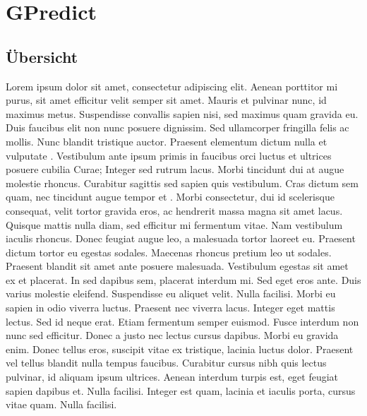 
\chapter{GPredict}

\section{Übersicht}

Lorem ipsum dolor sit amet, consectetur adipiscing elit. Aenean porttitor mi purus, sit amet efficitur velit semper sit amet. Mauris et pulvinar nunc, id maximus metus. Suspendisse convallis sapien nisi, sed maximus quam gravida eu. Duis faucibus elit non nunc posuere dignissim. Sed ullamcorper fringilla felis ac mollis. Nunc blandit tristique auctor. Praesent elementum dictum nulla et vulputate \cite{paper0}. Vestibulum ante ipsum primis in faucibus orci luctus et ultrices posuere cubilia Curae; Integer sed rutrum lacus. Morbi tincidunt dui at augue molestie rhoncus. Curabitur sagittis sed sapien quis vestibulum. Cras dictum sem quam, nec tincidunt augue tempor et \cite{kauffels}. Morbi consectetur, dui id scelerisque consequat, velit tortor gravida eros, ac hendrerit massa magna sit amet lacus. Quisque mattis nulla diam, sed efficitur mi fermentum vitae. Nam vestibulum iaculis rhoncus.\newpar
Donec feugiat augue leo, a malesuada tortor laoreet eu. Praesent dictum tortor eu egestas sodales. Maecenas rhoncus pretium leo ut sodales. Praesent blandit sit amet ante posuere malesuada. Vestibulum egestas sit amet ex et placerat. In sed dapibus sem, placerat interdum mi. Sed eget eros ante. Duis varius molestie eleifend. Suspendisse eu aliquet velit. Nulla facilisi. Morbi eu sapien in odio viverra luctus.\newpar
Praesent nec viverra lacus. Integer eget mattis lectus. Sed id neque erat. Etiam fermentum semper euismod. Fusce interdum non nunc sed efficitur. Donec a justo nec lectus cursus dapibus. Morbi eu gravida enim. Donec tellus eros, suscipit vitae ex tristique, lacinia luctus dolor. Praesent vel tellus blandit nulla tempus faucibus. Curabitur cursus nibh quis lectus pulvinar, id aliquam ipsum ultrices. Aenean interdum turpis est, eget feugiat sapien dapibus et. Nulla facilisi. Integer est quam, lacinia et iaculis porta, cursus vitae quam. Nulla facilisi.

